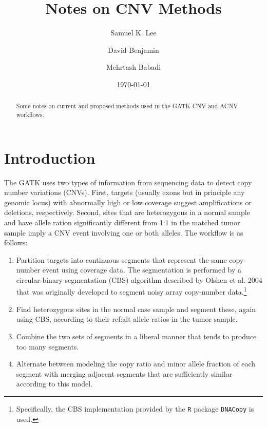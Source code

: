 \documentclass[nofootinbib,amssymb,amsmath]{revtex4}
\begin{document}
\title{Notes on CNV Methods}
\author{Samuel K. Lee}

\author{David Benjamin}

\author{Mehrtash Babadi}

\date{\today}

\begin{abstract}
Some notes on current and proposed methods used in the GATK CNV and ACNV workflows.
\end{abstract}

\maketitle

\section{Introduction}\label{introduction}

The GATK uses two types of information from sequencing data to detect copy number variations (CNVs).  First, targets (usually exons but in principle any genomic locus) with abnormally high or low coverage suggest amplifications or deletions, respectively.  Second, sites that are heterozygous in a normal sample and have allele ration significantly different from 1:1 in the matched tumor sample imply a CNV event involving one or both alleles.  The workflow is as follows:

\begin{enumerate}

\item Partition targets into continuous segments that represent the same copy-number event using coverage data.  The segmentation is performed by a circular-binary-segmentation (CBS) algorithm described by Olshen et al. 2004 that was originally developed to segment noisy array copy-number data.\footnote{Specifically, the CBS implementation provided by the \texttt{R} package \texttt{DNACopy} is used.}

\item Find heterozygous sites in the normal case sample and segment these, again using CBS, according to their ref:alt allele ratios in the tumor sample.

\item Combine the two sets of segments in a liberal manner that tends to produce too many segments.

\item Alternate between modeling the copy ratio and minor allele fraction of each segment with merging adjacent segments that are sufficiently similar according to this model.

\end{enumerate}
\end{document}
